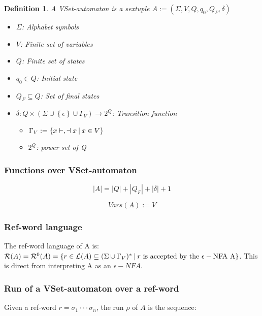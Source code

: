 \documentclass{article}
\newcommand{\set}[1]{\left\{#1\right\}}
\newcommand{\st}{\ \vline \ }
\newcommand{\ra}{\rightarrow}
\newtheorem{definition}{Definition}
\begin{document}
\begin{definition}
A VSet-automaton is a sextuple $A:=(\Sigma, V, Q, q_0, Q_F,\delta)$
\begin{itemize}
    \item $\Sigma$: Alphabet symbols
    \item $V$: Finite set of variables
    \item $Q$: Finite set of states
    \item $q_0\in Q$: Initial state
    \item $Q_F\subseteq Q$: Set of final states
    \item $\delta: Q \times (\Sigma\cup\set{\epsilon}\cup\Gamma_V)\ra 2^Q$: Transition function
        \begin{itemize}
            \item $\Gamma_V:=\set{x\vdash, \dashv x \st x \in V}$
            \item $2^Q$: power set of Q
        \end{itemize}
\end{itemize}
\end{definition}

\subsubsection*{Functions over VSet-automaton}

\begin{equation}
    |A| = |Q| + |Q_F| + |\delta| + 1
\end{equation}

\begin{equation}
    Vars(A) := V
\end{equation}

\subsubsection*{Ref-word language}
The ref-word language of A is: $\mathcal{R}(A) = \mathcal{R}^0(A) = \set{r \in \mathcal{L}(A)\subseteq(\Sigma\cup\Gamma_V)^*\st r\mathrm{\ is\ accepted\ by\ the\ \epsilon-NFA\ A}}$. This is direct from interpreting A as an $\epsilon-NFA$.

\subsubsection*{Run of a VSet-automaton over a ref-word}

Given a ref-word $r = \sigma_1\cdot\cdot\cdot\sigma_n$, the run $\rho$ of $A$ is the sequence:
\end{document}
